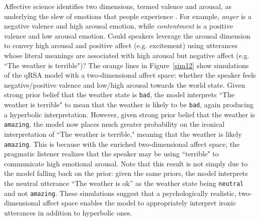 \documentclass[10pt,letterpaper]{article}
\begin{document}
Affective science identifies two dimensions, termed valence and arousal, as underlying the slew of emotions that people experience \cite{russell1980circumplex}. 
For example, \emph{anger} is a negative valence and high arousal emotion, while \emph{contentment} is a positive valence and low arousal emotion. 
Could speakers leverage the arousal dimension to convey high arousal and positive affect (e.g. excitement) using utterances whose literal meanings are associated with high arousal but negative affect (e.g. ``The weather is terrible")? The orange lines in Figure~\ref{sim12} show simulations of the qRSA model with a two-dimensional affect space: whether the speaker feels negative/positive valence and low/high arousal towards the world state. Given strong prior belief that the weather state is \texttt{bad}, the model interprets ``The weather is terrible" to mean that the weather is likely to be \texttt{bad}, again producing a hyperbolic interpretation. However, given strong prior belief that the weather is \texttt{amazing}, the model now places much greater probability on the ironical interpretation of ``The weather is terrible," meaning that the weather is likely \texttt{amazing}. This is because with the enriched two-dimensional affect space, the pragmatic listener realizes that the speaker may be using ``terrible" to communicate high emotional arousal. Note that this result is not simply due to the model falling back on the prior: given the same priors, the model interprets the neutral utterance ``The weather is ok'' as the weather state being \texttt{neutral} and not \texttt{amazing}.
These simulations suggest that a psychologically realistic, two-dimensional affect space enables the model to appropriately interpret ironic utterances in addition to hyperbolic ones. 

\end{document}
